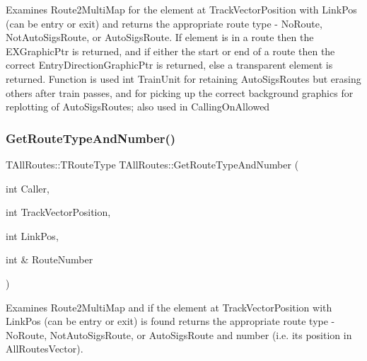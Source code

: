 Examines Route2\+Multi\+Map for the element at Track\+Vector\+Position with Link\+Pos (can be entry or exit) and returns the appropriate route type -\/ No\+Route, Not\+Auto\+Sigs\+Route, or Auto\+Sigs\+Route. If element is in a route then the E\+X\+Graphic\+Ptr is returned, and if either the start or end of a route then the correct Entry\+Direction\+Graphic\+Ptr is returned, else a transparent element is returned. Function is used int Train\+Unit for retaining Auto\+Sigs\+Routes but erasing others after train passes, and for picking up the correct background graphics for replotting of Auto\+Sigs\+Routes; also used in Calling\+On\+Allowed \mbox{\label{class_t_all_routes_a0a9ccbc84687f85806115877aa86dcfd}} 
\subsubsection{\texorpdfstring{Get\+Route\+Type\+And\+Number()}{GetRouteTypeAndNumber()}}
{\footnotesize\ttfamily T\+All\+Routes\+::\+T\+Route\+Type T\+All\+Routes\+::\+Get\+Route\+Type\+And\+Number (\begin{DoxyParamCaption}\item[{int}]{Caller,  }\item[{int}]{Track\+Vector\+Position,  }\item[{int}]{Link\+Pos,  }\item[{int \&}]{Route\+Number }\end{DoxyParamCaption})}

Examines Route2\+Multi\+Map and if the element at Track\+Vector\+Position with Link\+Pos (can be entry or exit) is found returns the appropriate route type -\/ No\+Route, Not\+Auto\+Sigs\+Route, or Auto\+Sigs\+Route and number (i.\+e. its position in All\+Routes\+Vector). \mbox{\label{class_t_all_routes_aa92b37f73176fcf3454688bb15b9f64c}} 
